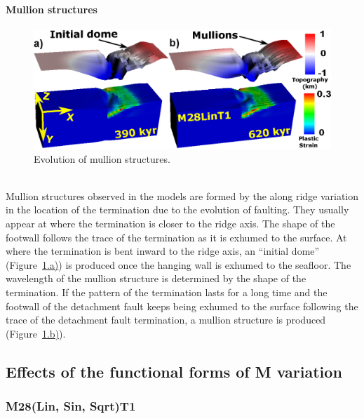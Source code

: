 \paragraph{Mullion structures}

\begin{figure}[h]
  \centering
    \includegraphics[width=1.0\textwidth]{./Figures/fig_Results_3_2_6_mullion_evolution.eps}
  \caption{Evolution of mullion structures.}
 \label{fig_Results_3_2_6_mullion_evolution}
\end{figure}
~\\
Mullion structures observed in the models are formed by the along ridge variation in the location of the termination due to the evolution of faulting. They usually appear at where the termination is closer to the ridge axis. The shape of the footwall follows the trace of the termination as it is exhumed to the surface. At where the termination is bent inward to the ridge axis, an ``initial dome'' (Figure~\hyperref[fig_Results_3_2_6_mullion_evolution]{\ref{fig_Results_3_2_6_mullion_evolution}.a)}) is produced once the hanging wall is exhumed to the seafloor. The wavelength of the mullion structure is determined by the shape of the termination. If the pattern of the termination lasts for a long time and the footwall of the detachment fault keeps being exhumed to the surface following the trace of the detachment fault termination, a mullion structure is produced (Figure~\hyperref[fig_Results_3_2_6_mullion_evolution]{\ref{fig_Results_3_2_6_mullion_evolution}.b)}). 


\subsection{Effects of the functional forms of M variation}

\subsubsection{M28(Lin, Sin, Sqrt)T1}

